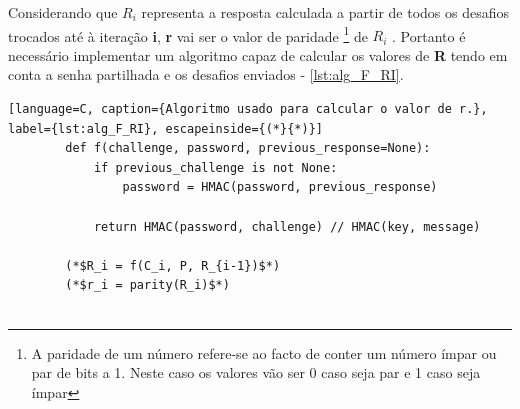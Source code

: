 \quad Considerando que \textbf{$R_i$} representa a resposta calculada a partir de todos os desafios trocados até à iteração \textbf{i}, \textbf{r} vai ser o valor de paridade \footnote{A paridade de um número refere-se ao facto de conter um número ímpar ou par de bits a 1. Neste caso os valores vão ser 0 caso seja par e 1 caso seja ímpar} de \textbf{$R_i$} . Portanto é necessário implementar um algoritmo capaz de calcular os valores de \textbf{R} tendo em conta a senha partilhada e os desafios enviados -  \ref{lst:alg_F_RI}.


\begin{minipage}{\linewidth}
    \begin{lstlisting}[language=C, caption={Algoritmo usado para calcular o valor de r.}, label={lst:alg_F_RI}, escapeinside={(*}{*)}]
        def f(challenge, password, previous_response=None):
            if previous_challenge is not None:
                password = HMAC(password, previous_response)
            
            return HMAC(password, challenge) // HMAC(key, message)

        (*$R_i = f(C_i, P, R_{i-1})$*)
        (*$r_i = parity(R_i)$*)
        
    \end{lstlisting}
\end{minipage}

